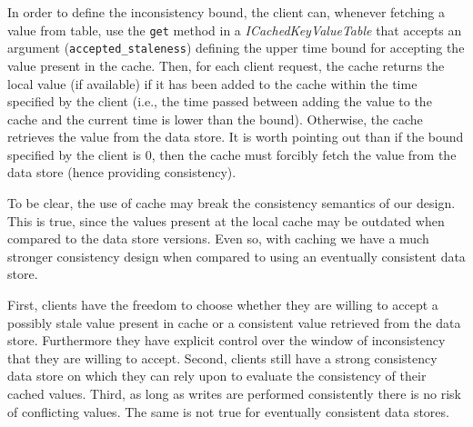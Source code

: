 In order to define the inconsistency bound, the client can, whenever fetching a value from table, use the \texttt{get} method in a \emph{ICachedKeyValueTable} that accepts an argument (\texttt{accepted\_staleness}) defining the upper time bound for accepting the value present in the cache. 
Then, for each client request, the cache returns the  local value (if available) if it has been added to the cache within the time specified by the client (i.e., the time passed between adding the value to the cache and the current time is lower than the bound). 
Otherwise, the cache retrieves the  value from the data store. 
It is worth pointing out than if the bound specified by the client is 0, then the cache must forcibly fetch the value from the data store (hence providing consistency). 

To be clear, the use of cache may break the consistency semantics of our design. 
This is true, since the values present at the local cache may be outdated when compared to the data store versions. 
Even so, with caching we have a much stronger consistency design when compared to using an eventually consistent data store. 

First, clients have the freedom to choose whether they are willing to accept a possibly stale value present in cache or a consistent value retrieved from the data store. 
Furthermore they have explicit control over the window of inconsistency that they are willing to accept. 
Second, clients still have a strong consistency data store on which they can rely upon to evaluate the consistency of their cached values. 
Third, as long as writes are performed consistently there is no risk of conflicting values. 
The same is not true for eventually consistent data stores. 



